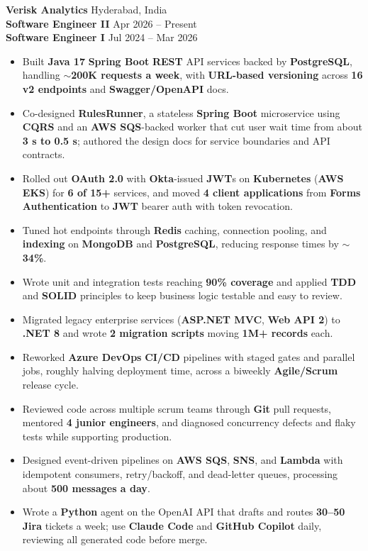 \documentclass[a4paper,10pt]{article}
\begin{document}
\textbf{Verisk Analytics} \hfill Hyderabad, India \\
\textbf{Software Engineer II} \hfill Apr 2026 -- Present \\
\textbf{Software Engineer I} \hfill Jul 2024 -- Mar 2026

\begin{itemize}[leftmargin=*]
    \item Built \textbf{Java 17} \textbf{Spring Boot} \textbf{REST} API services backed by \textbf{PostgreSQL}, handling \textbf{${\sim}$200K requests a week}, with \textbf{URL-based versioning} across \textbf{16 v2 endpoints} and \textbf{Swagger/OpenAPI} docs.
    \item Co-designed \textbf{RulesRunner}, a stateless \textbf{Spring Boot} microservice using \textbf{CQRS} and an \textbf{AWS SQS}-backed worker that cut user wait time from about \textbf{3 s to 0.5 s}; authored the design docs for service boundaries and API contracts.
    \item Rolled out \textbf{OAuth 2.0} with \textbf{Okta}-issued \textbf{JWT}s on \textbf{Kubernetes} (\textbf{AWS EKS}) for \textbf{6 of 15+} services, and moved \textbf{4 client applications} from \textbf{Forms Authentication} to \textbf{JWT} bearer auth with token revocation.
    \item Tuned hot endpoints through \textbf{Redis} caching, connection pooling, and \textbf{indexing} on \textbf{MongoDB} and \textbf{PostgreSQL}, reducing response times by ${\sim}$\textbf{34\%}.
    \item Wrote unit and integration tests reaching \textbf{90\% coverage} and applied \textbf{TDD} and \textbf{SOLID} principles to keep business logic testable and easy to review.
    \item Migrated legacy enterprise services (\textbf{ASP.NET MVC}, \textbf{Web API 2}) to \textbf{.NET 8} and wrote \textbf{2 migration scripts} moving \textbf{1M+ records} each.
    \item Reworked \textbf{Azure DevOps} \textbf{CI/CD} pipelines with staged gates and parallel jobs, roughly halving deployment time, across a biweekly \textbf{Agile/Scrum} release cycle.
    \item Reviewed code across multiple scrum teams through \textbf{Git} pull requests, mentored \textbf{4 junior engineers}, and diagnosed concurrency defects and flaky tests while supporting production.
    \item Designed event-driven pipelines on \textbf{AWS SQS}, \textbf{SNS}, and \textbf{Lambda} with idempotent consumers, retry/backoff, and dead-letter queues, processing about \textbf{500 messages a day}.
    \item Wrote a \textbf{Python} agent on the OpenAI API that drafts and routes \textbf{30--50 Jira} tickets a week; use \textbf{Claude Code} and \textbf{GitHub Copilot} daily, reviewing all generated code before merge.
\end{itemize}
\end{document}
